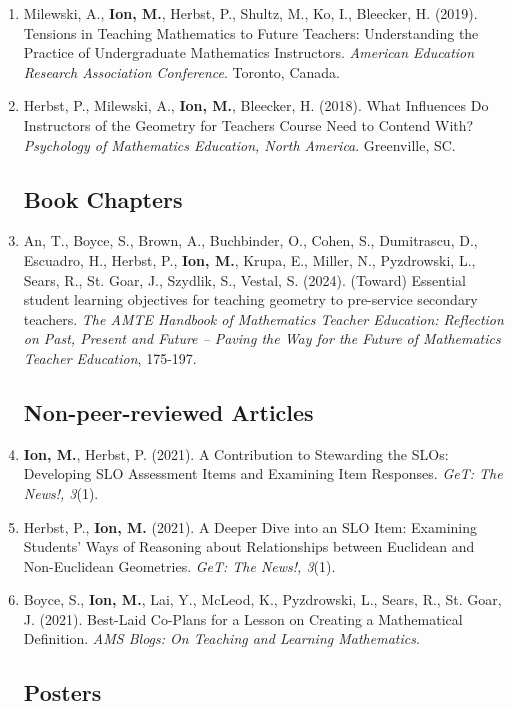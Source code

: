 \documentclass[a4paper,11pt]{article}
\newcommand{\yearsitem}[1]{%
  \item {\reversemarginpar\strut\marginnote{{\small#1}}}%
}
\begin{document}
\begin{enumerate}
\item Milewski, A., \textbf{Ion, M.}, Herbst, P., Shultz, M., Ko, I., Bleecker, H. (2019). Tensions in Teaching Mathematics to Future Teachers: Understanding the Practice of Undergraduate Mathematics Instructors. \emph{American Education Research Association Conference}. Toronto, Canada.

\yearsitem{2018}Herbst, P., Milewski, A., \textbf{Ion, M.}, Bleecker, H. (2018). What Influences Do Instructors of the Geometry for Teachers Course Need to Contend With? \emph{Psychology of Mathematics Education, North America}. Greenville, SC.



\subsection*{Book Chapters}

\yearsitem{2024}An, T., Boyce, S., Brown, A., Buchbinder, O., Cohen, S., Dumitrascu, D., Escuadro, H., Herbst, P., \textbf{Ion, M.}, Krupa, E., Miller, N., Pyzdrowski, L., Sears, R., St. Goar, J., Szydlik, S., Vestal, S. (2024). (Toward) Essential student learning objectives for teaching geometry to pre-service secondary teachers. \emph{The AMTE Handbook of Mathematics Teacher Education: Reflection on Past, Present and Future – Paving the Way for the Future of Mathematics Teacher Education}, 175-197.

\subsection*{Non-peer-reviewed Articles}

\yearsitem{2021}\textbf{Ion, M.}, Herbst, P. (2021). A Contribution to Stewarding the SLOs: Developing SLO Assessment Items and Examining Item Responses. \emph{GeT: The News!, 3}(1).

\item Herbst, P., \textbf{Ion, M.} (2021). A Deeper Dive into an SLO Item: Examining Students' Ways of Reasoning about Relationships between Euclidean and Non-Euclidean Geometries. \emph{GeT: The News!, 3}(1).

\item Boyce, S., \textbf{Ion, M.}, Lai, Y., McLeod, K., Pyzdrowski, L., Sears, R., St. Goar, J. (2021). Best-Laid Co-Plans for a Lesson on Creating a Mathematical Definition. \emph{AMS Blogs: On Teaching and Learning Mathematics}.

\subsection*{Posters}


\end{enumerate}
\end{document}
